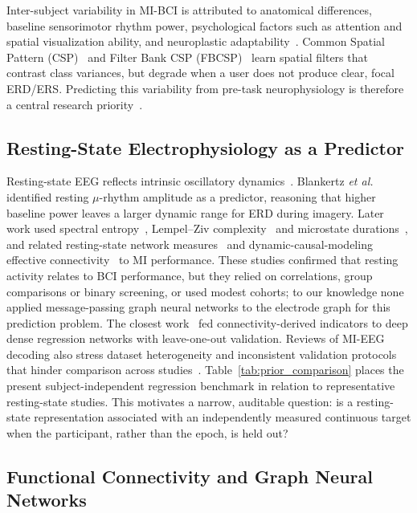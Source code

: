 \documentclass{ieeeaccess}
\begin{document}
Inter-subject variability in MI-BCI is attributed to anatomical differences, baseline sensorimotor rhythm power, psychological factors such as attention and spatial visualization ability, and neuroplastic adaptability~\cite{jeunet2016,blankertz2010,lotte2018}. Common Spatial Pattern (CSP)~\cite{ramoser2000} and Filter Bank CSP (FBCSP)~\cite{ang2012} learn spatial filters that contrast class variances, but degrade when a user does not produce clear, focal ERD/ERS. Predicting this variability from pre-task neurophysiology is therefore a central research priority~\cite{singh2021}.

\subsection{Resting-State Electrophysiology as a Predictor}

Resting-state EEG reflects intrinsic oscillatory dynamics~\cite{pfurtscheller2001}. Blankertz \textit{et al.}~\cite{blankertz2010} identified resting $\mu$-rhythm amplitude as a predictor, reasoning that higher baseline power leaves a larger dynamic range for ERD during imagery. Later work used spectral entropy~\cite{zhang2015entropy}, Lempel--Ziv complexity~\cite{wang2022} and microstate durations~\cite{cui2023}, and related resting-state network measures~\cite{zhang2015network} and dynamic-causal-modeling effective connectivity~\cite{lee2020} to MI performance. These studies confirmed that resting activity relates to BCI performance, but they relied on correlations, group comparisons or binary screening, or used modest cohorts; to our knowledge none applied message-passing graph neural networks to the electrode graph for this prediction problem. The closest work~\cite{caicedo2021} fed connectivity-derived indicators to deep dense regression networks with leave-one-out validation. Reviews of MI-EEG decoding also stress dataset heterogeneity and inconsistent validation protocols that hinder comparison across studies~\cite{khademi2023,wang2024survey,saibene2024,saibene2023wearable}. Table~\ref{tab:prior_comparison} places the present subject-independent regression benchmark in relation to representative resting-state studies. This motivates a narrow, auditable question: is a resting-state representation associated with an independently measured continuous target when the participant, rather than the epoch, is held out?

\subsection{Functional Connectivity and Graph Neural Networks}
\end{document}
